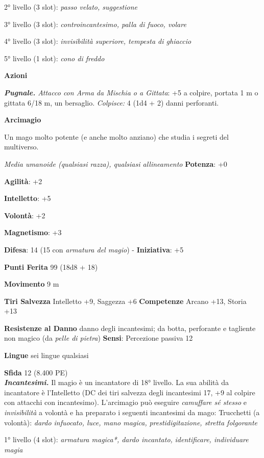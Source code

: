 \begin{multicols}{2}
2° livello (3 slot): \emph{passo velato, suggestione}

3° livello (3 slot): \emph{controincantesimo, palla di fuoco, volare}

4° livello (3 slot): \emph{invisibilità superiore, tempesta di ghiaccio}

5° livello (1 slot): \emph{cono di freddo}

\smallskip\textbf{Azioni}

\emph{\textbf{Pugnale.} Attacco con Arma da Mischia o a Gittata}: +5 a
colpire, portata 1 m o gittata 6/18 m, un bersaglio. \emph{Colpisce:}
4 (1d4 + 2) danni perforanti.




\textbf{Arcimagio}

Un mago molto potente (e anche molto anziano) che studia i segreti del
multiverso.

\emph{Media umanoide (qualsiasi razza), qualsiasi allineamento}
\textbf{Potenza}: +0

\textbf{Agilità}: +2

\textbf{Intelletto}: +5

\textbf{Volontà}: +2

\textbf{Magnetismo}: +3

\textbf{Difesa}: 14 (15 con \emph{armatura del magio}) - \textbf{Iniziativa}: +5

\textbf{Punti Ferita} 99 (18d8 + 18)

\textbf{Movimento} 9 m

\textbf{Tiri Salvezza} Intelletto +9, Saggezza +6 \textbf{Competenze}
Arcano +13, Storia +13

\textbf{Resistenze al Danno} danno degli incantesimi; da botta,
perforante e tagliente non magico (da \emph{pelle di pietra})
\textbf{Sensi}: Percezione passiva 12

\textbf{Lingue} sei lingue qualsiasi

\textbf{Sfida} 12 (8.400 PE)\smallskip\\

\emph{\textbf{Incantesimi.}} Il magio è un incantatore di 18° livello.
La sua abilità da incantatore è l'Intelletto (DC dei tiri salvezza
degli incantesimi 17, +9 al colpire con attacchi con incantesimo).
L'arcimagio può eseguire \emph{camuffare sé stesso} e
\emph{invisibilità} a volontà e ha preparato i seguenti incantesimi da
mago: Trucchetti (a volontà): \emph{dardo infuocato, luce, mano magica,}
\emph{prestidigitazione, stretta folgorante}

1° livello (4 slot): \emph{armatura magica*, dardo incantato,}
\emph{identificare, individuare magia}


\end{multicols}
